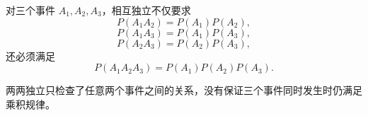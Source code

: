 \begin{trapbox}
\begin{description}[style=nextline, leftmargin=2.8em, labelsep=0.5em, itemsep=0.35em]
    \item[\textbf{\textcolor{CTrap}{正确理解（两两独立不够）：}}]
    对三个事件 $A_1,A_2,A_3$，相互独立不仅要求
    \[
        P(A_1A_2)=P(A_1)P(A_2),
    \]
    \[
        P(A_1A_3)=P(A_1)P(A_3),
    \]
    \[
        P(A_2A_3)=P(A_2)P(A_3),
    \]
    还必须满足
    \[
        P(A_1A_2A_3)
        =
        P(A_1)P(A_2)P(A_3).
    \]

    \item[\textbf{\textcolor{CTrap}{错因分析（条件遗漏）：}}]
    两两独立只检查了任意两个事件之间的关系，没有保证三个事件同时发生时仍满足乘积规律。

\end{description}

\end{trapbox}